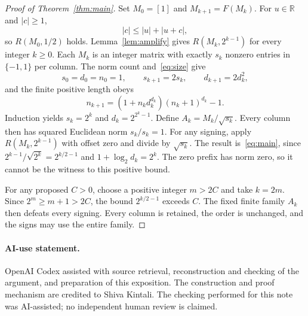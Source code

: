 \documentclass[11pt]{article}
\newcommand{\R}{\mathbb R}
\begin{document}
\begin{proof}[Proof of Theorem~\ref{thm:main}]
Set $M_0=[1]$ and $M_{k+1}=F(M_k)$. For $u\in\R$ and $|c|\ge1$,
\[
|c|\le|u|+|u+c|,
\]
so $R(M_0,1/2)$ holds. Lemma~\ref{lem:amplify} gives
$R(M_k,2^{k-1})$ for every integer $k\ge0$.
Each $M_k$ is an integer matrix with exactly $s_k$ nonzero entries in
$\{-1,1\}$ per column. The norm count and~\eqref{eq:size} give
\[
s_0=d_0=n_0=1,\qquad s_{k+1}=2s_k,\qquad d_{k+1}=2d_k^2,
\]
and the finite positive length obeys
\[
n_{k+1}=(1+n_kd_k^{d_k})(n_k+1)^{d_k}-1.
\]
Induction yields $s_k=2^k$ and $d_k=2^{2^k-1}$.
Define $A_k=M_k/\sqrt{s_k}$. Every column then has squared Euclidean
norm $s_k/s_k=1$. For any signing, apply $R(M_k,2^{k-1})$ with
offset zero and divide by $\sqrt{s_k}$. The result is~\eqref{eq:main},
since $2^{k-1}/\sqrt{2^k}=2^{k/2-1}$ and
$1+\log_2d_k=2^k$. The zero prefix has norm zero, so it cannot be
the witness to this positive bound.

For any proposed $C>0$, choose a positive integer $m>2C$ and take
$k=2m$. Since $2^m\ge m+1>2C$, the bound $2^{k/2-1}$ exceeds $C$.
The fixed finite family $A_k$ then defeats every signing. Every column is
retained, the order is unchanged, and the signs may use the entire family.
\end{proof}

\paragraph{AI-use statement.}
OpenAI Codex assisted with source retrieval, reconstruction and checking
of the argument, and preparation of this exposition. The construction
and proof mechanism are credited to Shiva Kintali. The checking performed
for this note was AI-assisted; no independent human review is claimed.
\end{document}

